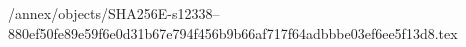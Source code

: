 /annex/objects/SHA256E-s12338--880ef50fe89e59f6e0d31b67e794f456b9b66af717f64adbbbe03ef6ee5f13d8.tex
